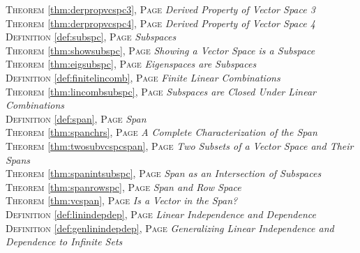 \begin{multicols}{2}
{         \textsc{Theorem} \ref{thm:derpropvcspc3}, \textsc{Page} \pageref{thm:derpropvcspc3} \textit{Derived Property of Vector Space 3} \\
         \textsc{Theorem} \ref{thm:derpropvcspc4}, \textsc{Page} \pageref{thm:derpropvcspc4} \textit{Derived Property of Vector Space 4} \\
         \textsc{Definition} \ref{def:subspc}, \textsc{Page} \pageref{def:subspc} \textit{Subspaces} \\
         \textsc{Theorem} \ref{thm:showsubspc}, \textsc{Page} \pageref{thm:showsubspc} \textit{Showing a Vector Space is a Subspace} \\
         \textsc{Theorem} \ref{thm:eigsubspc}, \textsc{Page} \pageref{thm:eigsubspc} \textit{Eigenspaces are Subspaces} \\
         \textsc{Definition} \ref{def:finitelincomb}, \textsc{Page} \pageref{def:finitelincomb} \textit{Finite Linear Combinations} \\
         \textsc{Theorem} \ref{thm:lincombsubspc}, \textsc{Page} \pageref{thm:lincombsubspc} \textit{Subspaces are Closed Under Linear Combinations} \\
         \textsc{Definition} \ref{def:span}, \textsc{Page} \pageref{def:span} \textit{Span} \\
         \textsc{Theorem} \ref{thm:spanchrs}, \textsc{Page} \pageref{thm:spanchrs} \textit{A Complete Characterization of the Span} \\
         \textsc{Theorem} \ref{thm:twosubvcspcspan}, \textsc{Page} \pageref{thm:twosubvcspcspan} \textit{Two Subsets of a Vector Space and Their Spans} \\
         \textsc{Theorem} \ref{thm:spanintsubspc}, \textsc{Page} \pageref{thm:spanintsubspc} \textit{Span as an Intersection of Subspaces} \\
         \textsc{Theorem} \ref{thm:spanrowspc}, \textsc{Page} \pageref{thm:spanrowspc} \textit{Span and Row Space} \\
         \textsc{Theorem} \ref{thm:vcspan}, \textsc{Page} \pageref{thm:vcspan} \textit{Is a Vector in the Span?} \\
         \textsc{Definition} \ref{def:linindepdep}, \textsc{Page} \pageref{def:linindepdep} \textit{Linear Independence and Dependence} \\
         \textsc{Definition} \ref{def:genlinindepdep}, \textsc{Page} \pageref{def:genlinindepdep} \textit{Generalizing Linear Independence and Dependence to Infinite Sets} \\
}
\end{multicols}
